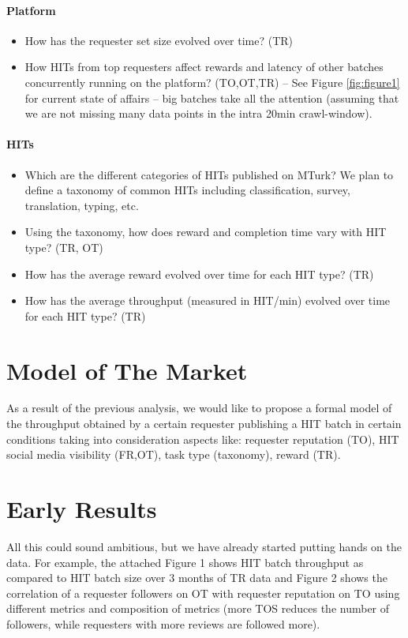 \documentclass{llncs}
\begin{document}
\paragraph{Platform}
\begin{itemize}
	\item How has the requester set size evolved over time? (TR)
	\item How HITs from top requesters affect rewards and latency of other batches concurrently running on the platform? (TO,OT,TR)
	-- See Figure \ref{fig:figure1} for current state of affairs -- big batches take all the attention (assuming that we are not missing many data points in the intra 20min crawl-window).
\end{itemize}

\paragraph{HITs}
\begin{itemize}
	\item Which are the different categories of HITs published on MTurk? We plan to define a taxonomy of common HITs including classification, survey, translation, typing, etc.
	\item Using the taxonomy, how does reward and completion time vary with HIT type? (TR, OT)
	\item How has the average reward evolved over time for each HIT type? (TR)
	\item How has the average throughput (measured in HIT/min) evolved over time for each HIT type? (TR)
\end{itemize}

\section{Model of The Market}
As a result of the previous analysis, we would like to propose a formal model of the throughput obtained by a certain requester publishing a HIT batch in certain conditions taking into consideration aspects like: requester reputation (TO), HIT social media visibility (FR,OT), task type (taxonomy), reward (TR).

\section{Early Results}
All this could sound ambitious, but we have already started putting hands on the data. For example, the attached Figure 1 shows HIT batch throughput as compared to HIT batch size over 3 months of TR data and Figure 2 shows the correlation of a requester followers on OT with requester reputation on TO using different metrics and composition of metrics (more TOS reduces the number of followers, while requesters with more reviews are followed more).
\end{document}
